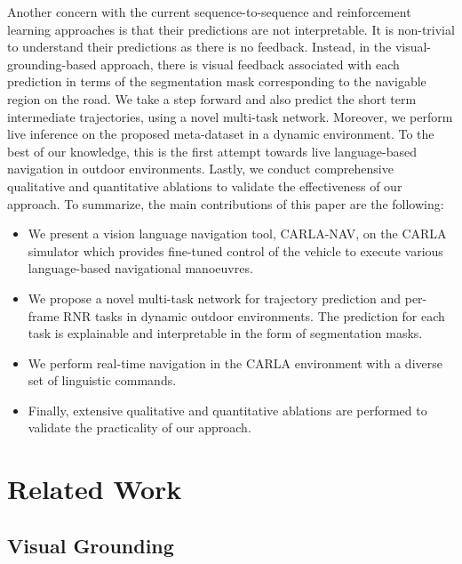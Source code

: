 \documentclass[11pt]{article}
\begin{document}
Another concern with the current sequence-to-sequence and reinforcement learning approaches is that their predictions are not interpretable. It is non-trivial to understand their predictions as there is no feedback. Instead, in the visual-grounding-based approach, there is visual feedback associated with each prediction in terms of the segmentation mask corresponding to the navigable region on the road. We take a step forward and also predict the short term intermediate trajectories, using a novel multi-task network. Moreover, we perform live inference on the proposed meta-dataset in a dynamic environment. To the best of our knowledge, this is the first attempt towards live language-based navigation in outdoor environments. Lastly, we conduct comprehensive qualitative and quantitative ablations to validate the effectiveness of our approach. To summarize, the main contributions of this paper are the following:

\begin{itemize}
\item We present a vision language navigation tool, CARLA-NAV, on the CARLA simulator which provides fine-tuned control of the vehicle to execute various language-based navigational manoeuvres.
\item We propose a novel multi-task network for trajectory prediction and per-frame RNR tasks in dynamic outdoor environments. The prediction for each task is explainable and interpretable in the form of segmentation masks.
\item We perform real-time navigation in the CARLA environment with a diverse set of linguistic commands.
\item Finally, extensive qualitative and quantitative ablations are performed to validate the practicality of our approach.  

\end{itemize}

\section{Related Work}


\subsection{Visual Grounding}
\end{document}
